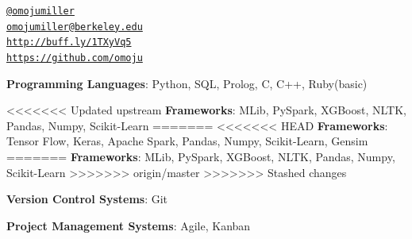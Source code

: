 \documentclass[11pt,article,oneside]{memoir}
\makeatletter
\def\myemail{omojumiller@berkeley.edu}
\def\mytwitter{@omojumiller}
\def\mylinkedin{http://buff.ly/1TXyVq5}
\def\mygithub{https://github.com/omoju}
\makeatother
\begin{document}
\begin{minipage}[t]{2.95in}
  
\end{minipage}
\hfill     
\hfill
\begin{minipage}[t]{2.6in}
  \flushright \footnotesize  \addressblock 
  {\scriptsize  \texttt{\href{http://twitter.com/omojumiller}{\mytwitter}} \, \faTwitter }  \\ 
  {\scriptsize  \texttt{\href{mailto:\myemail}{\myemail}} \, \faEnvelope} \\
  {\scriptsize  \texttt{\href{\mylinkedin}{\mylinkedin}} \, \faLinkedin} \\
  {\scriptsize  \texttt{\href{\mygithub}{\mygithub}} \, \faGithub} 
\end{minipage}

\medskip


\bigskip       
{}
\reversemarginpar

\medskip

\ind \textbf{Programming Languages}: Python, SQL, Prolog, C, C++, Ruby(basic)

<<<<<<< Updated upstream
\ind \textbf{Frameworks}: MLib, PySpark, XGBoost, NLTK, Pandas, Numpy, Scikit-Learn
=======
<<<<<<< HEAD
\ind \textbf{Frameworks}: Tensor Flow, Keras, Apache Spark, Pandas, Numpy, Scikit-Learn, Gensim
=======
\ind \textbf{Frameworks}: MLib, PySpark, XGBoost, NLTK, Pandas, Numpy, Scikit-Learn
>>>>>>> origin/master
>>>>>>> Stashed changes

\ind \textbf{Version Control Systems}: Git

\ind \textbf{Project Management Systems}: Agile, Kanban
\bigskip 



\medskip
\end{document}
